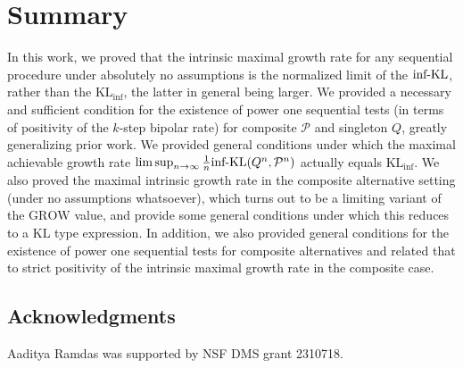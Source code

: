 \documentclass[11pt]{article}
\newcommand{\KL}{\mathrm{KL}}
\newcommand{\KLinf}{\mathrm{KL}_{\mathrm{inf}}}
\newcommand{\infKL}{\textnormal{inf-KL}}
\newcommand{\Pcal}{\mathcal{P}}
\newcommand{\Qcal}{\mathcal{Q}}
\theoremstyle{definition}
\theoremstyle{definition}
\begin{document}
\section{Summary}\label{sec:cute}
In this work, we proved that the intrinsic maximal growth rate for any sequential procedure under absolutely no assumptions is the normalized limit of the $\infKL$, rather than the $\KLinf$, the latter in general being larger. We provided a necessary and sufficient condition for the existence of power one sequential tests (in terms of positivity of the $k$-step bipolar rate) for composite $\Pcal$ and singleton $Q$, greatly generalizing prior work. We provided general conditions under which  the maximal achievable growth rate $\limsup_{n\to\infty}\frac1n\infKL(Q^n,\Pcal^n)$ actually equals $\KLinf$. We also proved the maximal intrinsic growth rate in the composite alternative setting (under no assumptions whatsoever), which turns out to be a limiting variant of the $\mathrm{GROW}$ value, and provide some general conditions under which this reduces to a $\KL$ type expression. In addition, we also provided general conditions for the existence of power one sequential tests for composite alternatives and related that to strict positivity of the intrinsic maximal growth rate in the composite case. 


\subsection*{Acknowledgments}
Aaditya Ramdas was supported by NSF DMS grant 2310718.
\end{document}
